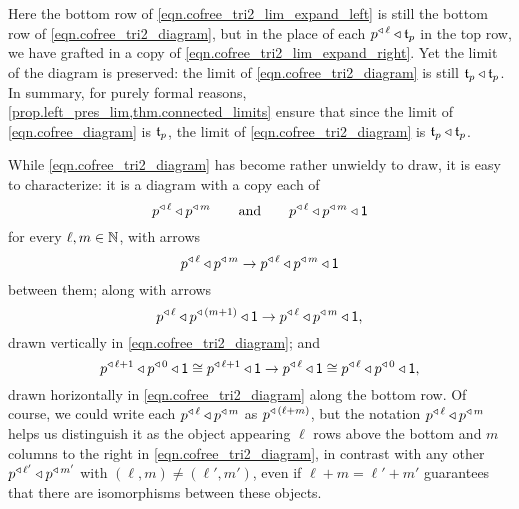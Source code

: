 \documentclass[Book-Poly]{subfiles}
\begin{document}
Here the bottom row of \eqref{eqn.cofree_tri2_lim_expand_left} is still the bottom row of \eqref{eqn.cofree_tri2_diagram}, but in the place of each $p\tripow\ell\tri\ema{t}_p$ in the top row, we have grafted in a copy of \eqref{eqn.cofree_tri2_lim_expand_right}.
Yet the limit of the diagram is preserved: the limit of \eqref{eqn.cofree_tri2_diagram} is still $\ema{t}_p\tri\ema{t}_p$.
In summary, for purely formal reasons, \cref{prop.left_pres_lim,thm.connected_limits} ensure that since the limit of \eqref{eqn.cofree_diagram} is $\ema{t}_p$, the limit of \eqref{eqn.cofree_tri2_diagram} is $\ema{t}_p\tri\ema{t}_p$.

While \eqref{eqn.cofree_tri2_diagram} has become rather unwieldy to draw, it is easy to characterize: it is a diagram with a copy each of
\[
    p\tripow\ell\tri p\tripow{m} \qqand p\tripow\ell\tri p\tripow{m}\tri\1
\]
for every $\ell,m\in\nn$, with arrows
\begin{equation} \label{eqn.cofree_tri2_diagram_arr_diag}
    p\tripow\ell\tri p\tripow{m}\to p\tripow\ell\tri p\tripow{m}\tri\1
\end{equation}
between them; along with arrows
\begin{equation} \label{eqn.cofree_tri2_diagram_arr_vert}
    p\tripow\ell\tri p\tripow{(m+1)}\tri\1\to p\tripow\ell\tri p\tripow{m}\tri\1,
\end{equation}
drawn vertically in \eqref{eqn.cofree_tri2_diagram}; and
\begin{equation} \label{eqn.cofree_tri2_diagram_arr_horiz}
    p\tripow{\ell+1}\tri p\tripow0\tri\1\iso p\tripow{\ell+1}\tri\1\to p\tripow\ell\tri\1\iso p\tripow\ell\tri p\tripow0\tri\1,
\end{equation}
drawn horizontally in \eqref{eqn.cofree_tri2_diagram} along the bottom row.
Of course, we could write each $p\tripow\ell\tri p\tripow{m}$ as $p\tripow{(\ell+m)}$, but the notation $p\tripow\ell\tri p\tripow{m}$ helps us distinguish it as the object appearing $\ell$ rows above the bottom and $m$ columns to the right in \eqref{eqn.cofree_tri2_diagram}, in contrast with any other $p\tripow{\ell'}\tri p\tripow{m'}$ with $(\ell,m)\neq(\ell',m')$, even if $\ell+m=\ell'+m'$ guarantees that there are isomorphisms between these objects.
\end{document}
